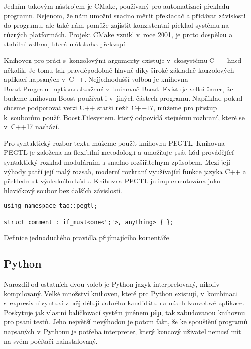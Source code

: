 Jedním takovým nástrojem je CMake\cite{cmake-overview}, používaný pro automatizaci překladu programu. Nejenom, že nám umožní snadno měnit překladač a při\-dá\-vat závislosti do programu, ale také nám pomůže zajistit konzistentní překlad systému na různých platformách. Projekt CMake vznikl v~roce 2001\cite{cmake-overview}, je proto dospělou a stabilní volbou, která málokoho překvapí.

Knihoven pro práci s~konzolovými argumenty existuje v~ekosystému C++ hned několik. Je tomu tak pravděpodobně hlavně díky široké základně konzolových aplikací napsaných v~C++. Nejjednodušší volbou je knihovna Boost.Program\_options obsažená v~knihovně Boost\cite{boost-filesystem}. Existuje velká šance, že budeme knihovnu Boost používat i v~jiných částech programu. Například  pokud chceme podporovat verzi C++ starší nežli C++17\cite{cpp-filesystem}, můžeme pro přístup k~souborům použít Boost.Filesystem, který odpovídá stejnému rozhraní, které se v~C++17 nachází\cite{boost-filesystem}.

Pro syntaktický rozbor textu můžeme použít knihovnu PEGTL\cite{github-pegtl}. Kni\-hov\-na PEGTL je založena na flexibilní metodologii a umožňuje psát kód provádějící syntaktický rozklad modulárním a snadno rozšiřitelným způsobem. Mezi její výhody patří její malý rozsah, moderní rozhraní využívající funkce jazyka C++ a přehlednost výsledného kódu. Knihovna PEGTL je implementována jako hlavičkový soubor bez dalších závislostí\cite{github-pegtl}.

\begin{listing}[htbp]
\begin{verbatim}
using namespace tao::pegtl;

struct comment : if_must<one<';'>, anything> { };
\end{verbatim}
\caption{Definice jednoduchého pravidla přijímajícího komentáře}
\label{fig:peg-example}
\end{listing}

\subsection{Python}

Narozdíl od ostatních dvou voleb je Python jazyk interpretovaný, nikoliv kompilovaný. Velké množství knihoven, které pro Python existují, v~kombinaci s~expresivní syntaxí z~něj dělají dobrého kandidáta na návrh konzolové aplikace. Poskytuje jak vlastní balíčkovací systém jménem \textbf{pip}\cite{pip}, tak zabudovanou knihovnu pro psaní testů\cite{python-unittest}. Jeho největší nevýhodou je potom fakt, že ke spouštění programů napsaných v~Pythonu je potřeba interpreter, který koncový uživatel nemusí mít na svém počítači nainstalovaný.

